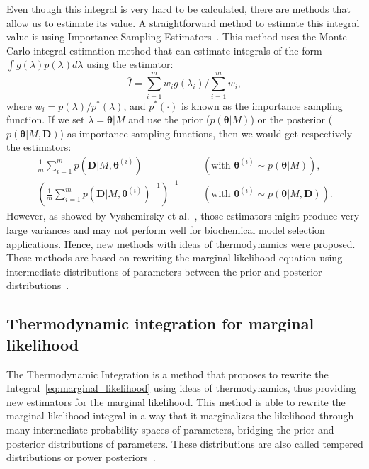 Even though this integral is very hard to be calculated, there are 
methods that allow us to estimate its value. A straightforward method 
to estimate this integral value is using Importance Sampling 
Estimators~\cite{Newton1993}. This method uses the Monte Carlo integral 
estimation method that can estimate integrals of the form 
$\int g(\lambda) p(\lambda)d\lambda$ using the estimator:
\begin{equation}
    \hat{I} = \sum_{i = 1}^m w_i g(\lambda_i) / \sum_{i = 1}^m w_i,
\label{eq:importance_sampling_estimator}
\end{equation}
where $w_i = p (\lambda) / p^* (\lambda)$, and $p^*(\cdot)$ is known as 
the importance sampling function. If we set $\lambda = {\bm\theta} | M$ 
and use the prior ($p({\bm \theta} | M)$) or the posterior ($p({\bm
\theta} | M, {\bm D})$) as importance sampling functions, then we would
get respectively the estimators:
\begin{equation}
\begin{aligned}
    \frac{1}{m} \sum_{i = 1}^m p({\bm D}|M, {\bm \theta}^{(i)}) &&& 
        (\text{with } {\bm \theta}^{(i)} \sim p({\bm \theta}|M)), \\
    \left(\frac{1}{m} \sum_{i = 1}^m p({\bm D}|M, 
            {\bm \theta}^{(i)})^{-1} \right)^{-1} &&&
        (\text{with } {\bm \theta}^{(i)} \sim p({\bm \theta}|M, 
            {\bm D})).
\end{aligned}
\end{equation}
However, as showed by Vyshemirsky et al.~\cite{Vyshemirsky2007}, those estimators might
produce very large variances and may not perform well for biochemical
model selection applications. Hence, new methods with ideas of 
thermodynamics were proposed. These methods are based on rewriting the
marginal likelihood equation using intermediate distributions of 
parameters between the prior and posterior 
distributions~\cite{Friel2008}.

\label{sec:thermodynamic_integration}
\subsection{Thermodynamic integration for marginal likelihood}
The Thermodynamic Integration is a method that proposes to rewrite
the Integral~\ref{eq:marginal_likelihood} using ideas of thermodynamics,
thus providing new estimators for the marginal likelihood. This method is
able to rewrite the marginal likelihood integral in a way that it 
marginalizes the likelihood through many intermediate probability spaces 
of parameters, bridging the prior and posterior distributions of 
parameters. These distributions are also called tempered distributions
or power posteriors~\cite{Friel2008}.


